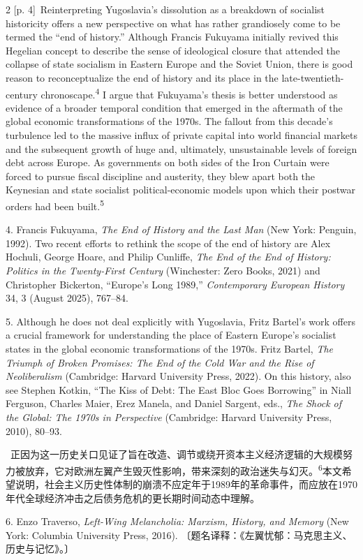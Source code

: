 \documentclass[10pt,a4paper]{article}
\begin{document}
\begin{paracol}{2}
{\scriptsize\color{gray} [p. 4]}\ Reinterpreting Yugoslavia’s dissolution as a breakdown of socialist historicity offers a new perspective on what has rather grandiosely come to be termed the “end of history.” Although Francis Fukuyama initially revived this Hegelian concept to describe the sense of ideological closure that attended the collapse of state socialism in Eastern Europe and the Soviet Union, there is good reason to reconceptualize the end of history and its place in the late-twentieth-century chronoscape.\nobreak\textsuperscript{4} I argue that Fukuyama’s thesis is better understood as evidence of a broader temporal condition that emerged in the aftermath of the global economic transformations of the 1970s. The fallout from this decade’s turbulence led to the massive influx of private capital into world financial markets and the subsequent growth of huge and, ultimately, unsustainable levels of foreign debt across Europe. As governments on both sides of the Iron Curtain were forced to pursue fiscal discipline and austerity, they blew apart both the Keynesian and state socialist political-economic models upon which their postwar orders had been built.\nobreak\textsuperscript{5}\par{\small 4. Francis Fukuyama, \textit{The End of History and the Last Man} (New York: Penguin, 1992). Two recent efforts to rethink the scope of the end of history are Alex Hochuli, George Hoare, and Philip Cunliffe, \textit{The End of the End of History: Politics in the Twenty-First Century} (Winchester: Zero Books, 2021) and Christopher Bickerton, “Europe’s Long 1989,” \textit{Contemporary European History} 34, 3 (August 2025), 767–84.\par}{\small 5. Although he does not deal explicitly with Yugoslavia, Fritz Bartel’s work offers a crucial framework for understanding the place of Eastern Europe’s socialist states in the global economic transformations of the 1970s. Fritz Bartel, \textit{The Triumph of Broken Promises: The End of the Cold War and the Rise of Neoliberalism} (Cambridge: Harvard University Press, 2022). On this history, also see Stephen Kotkin, “The Kiss of Debt: The East Bloc Goes Borrowing” in Niall Ferguson, Charles Maier, Erez Manela, and Daniel Sargent, eds., \textit{The Shock of the Global: The 1970s in Perspective} (Cambridge: Harvard University Press, 2010), 80–93.\par}
\switchcolumn*
{\scriptsize\color{gray} [p. 4]}\ 正因为这一历史关口见证了旨在改造、调节或绕开资本主义经济逻辑的大规模努力被放弃，它对欧洲左翼产生毁灭性影响，带来深刻的政治迷失与幻\mbox{灭。\textsuperscript{6}}本文希望说明，社会主义历史性体制的崩溃不应定年于1989年的革命事件，而应放在1970年代全球经济冲击之后债务危机的更长期时间动态中理解。\par{\small 6. Enzo Traverso, \textit{Left-Wing Melancholia: Marxism, History, and Memory} (New York: Columbia University Press, 2016). 〔题名译释：《左翼忧郁：马克思主义、历史与记忆》。〕\par}

\end{paracol}
\end{document}
